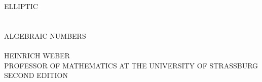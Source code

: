 \vspace*{2cm}
\begin{center}
{\Large ELLIPTIC}\\[1.2cm]
{\Large {}}\\[0.8cm]
{\small {}}\\[0.7cm]
{\Large ALGEBRAIC NUMBERS}\\[2cm]
{\small {}}\\[0.8cm]
{\Large HEINRICH WEBER}\\[0.2cm]
{\small PROFESSOR OF MATHEMATICS AT THE UNIVERSITY OF STRASSBURG}\\[2cm]
{\large SECOND EDITION}\\[1.2cm]
{\small {}}\\[2.2cm]
{\large {}}\\[0.2cm]
\\[0.2cm]
{\large {}}
\end{center}
